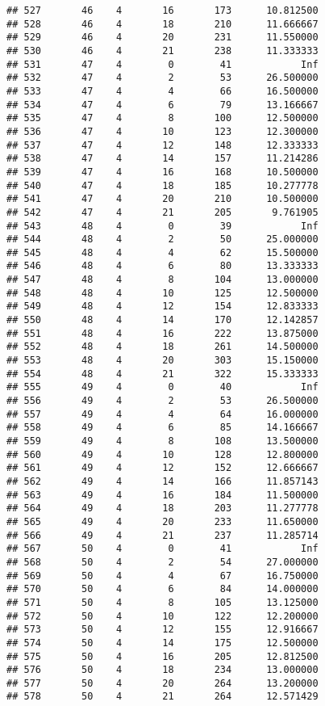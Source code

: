 \documentclass[
]{article}
\begin{document}
\begin{verbatim}
## 527       46    4       16       173      10.812500
## 528       46    4       18       210      11.666667
## 529       46    4       20       231      11.550000
## 530       46    4       21       238      11.333333
## 531       47    4        0        41            Inf
## 532       47    4        2        53      26.500000
## 533       47    4        4        66      16.500000
## 534       47    4        6        79      13.166667
## 535       47    4        8       100      12.500000
## 536       47    4       10       123      12.300000
## 537       47    4       12       148      12.333333
## 538       47    4       14       157      11.214286
## 539       47    4       16       168      10.500000
## 540       47    4       18       185      10.277778
## 541       47    4       20       210      10.500000
## 542       47    4       21       205       9.761905
## 543       48    4        0        39            Inf
## 544       48    4        2        50      25.000000
## 545       48    4        4        62      15.500000
## 546       48    4        6        80      13.333333
## 547       48    4        8       104      13.000000
## 548       48    4       10       125      12.500000
## 549       48    4       12       154      12.833333
## 550       48    4       14       170      12.142857
## 551       48    4       16       222      13.875000
## 552       48    4       18       261      14.500000
## 553       48    4       20       303      15.150000
## 554       48    4       21       322      15.333333
## 555       49    4        0        40            Inf
## 556       49    4        2        53      26.500000
## 557       49    4        4        64      16.000000
## 558       49    4        6        85      14.166667
## 559       49    4        8       108      13.500000
## 560       49    4       10       128      12.800000
## 561       49    4       12       152      12.666667
## 562       49    4       14       166      11.857143
## 563       49    4       16       184      11.500000
## 564       49    4       18       203      11.277778
## 565       49    4       20       233      11.650000
## 566       49    4       21       237      11.285714
## 567       50    4        0        41            Inf
## 568       50    4        2        54      27.000000
## 569       50    4        4        67      16.750000
## 570       50    4        6        84      14.000000
## 571       50    4        8       105      13.125000
## 572       50    4       10       122      12.200000
## 573       50    4       12       155      12.916667
## 574       50    4       14       175      12.500000
## 575       50    4       16       205      12.812500
## 576       50    4       18       234      13.000000
## 577       50    4       20       264      13.200000
## 578       50    4       21       264      12.571429
\end{verbatim}
\end{document}
